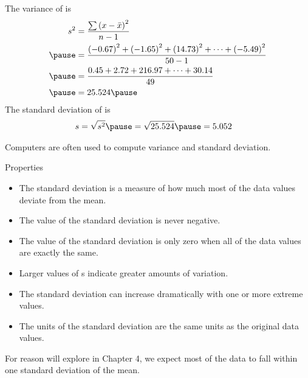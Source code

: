 \documentclass[handout]{beamer}
\begin{document}
\begin{frame}
\begin{example}
The variance of  is
\begin{equation*}
\begin{aligned}
s^2 &= \dfrac{\sum {\left(x-\bar{x}\right)}^2}{n-1}\\\pause
&=  \dfrac{{(-0.67)}^2+{(-1.65)}^2+{(14.73)}^2+\cdots+{(-5.49)}^2}{50-1}  \\\pause
&= \dfrac{0.45+2.72+216.97+\cdots+30.14}{49} \\\pause
&= 25.524\pause
\end{aligned}
\end{equation*}
The standard deviation of  is
\begin{equation*}
\begin{aligned}
s &= \sqrt{s^2} \pause = \sqrt{25.524} \pause = 5.052
\end{aligned}
\end{equation*}
\end{example}\pause
\begin{note}
Computers are often used to compute variance and standard deviation.
\end{note}
\end{frame}

\begin{frame}
\begin{block}{Properties}
\begin{itemize}[<+- | alert@+>]
\item The standard deviation is a measure of how much most of the data values deviate from the mean.
\item The value of the standard deviation is never negative.
\item The value of the standard deviation is only zero when all of the data values are exactly the same.
\item Larger values of s indicate greater amounts of variation.
\item The standard deviation can increase dramatically with one or more extreme values.
\item The units of the standard deviation are the same units as the original data values.
\end{itemize}
\end{block}
\onslide<+->
\begin{note}
For reason will explore in Chapter 4, we expect most of the data to fall within one standard deviation of the mean.
\end{note}
\end{frame}
\end{document}
